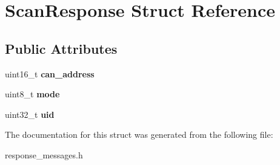 \hypertarget{structScanResponse}{}\section{Scan\+Response Struct Reference}
\label{structScanResponse}
\subsection*{Public Attributes}
\begin{DoxyCompactItemize}
\item 
uint16\+\_\+t {\bfseries can\+\_\+address}\hypertarget{structScanResponse_a5984426066ffa49ea49e9a1093a1f30b}{}\label{structScanResponse_a5984426066ffa49ea49e9a1093a1f30b}

\item 
uint8\+\_\+t {\bfseries mode}\hypertarget{structScanResponse_a9189a41b9ad5fc226a4c18f04399ec84}{}\label{structScanResponse_a9189a41b9ad5fc226a4c18f04399ec84}

\item 
uint32\+\_\+t {\bfseries uid}\hypertarget{structScanResponse_a03bd906c8ce581d26cf4857bf881b9cf}{}\label{structScanResponse_a03bd906c8ce581d26cf4857bf881b9cf}

\end{DoxyCompactItemize}


The documentation for this struct was generated from the following file\+:\begin{DoxyCompactItemize}
\item 
response\+\_\+messages.\+h\end{DoxyCompactItemize}
